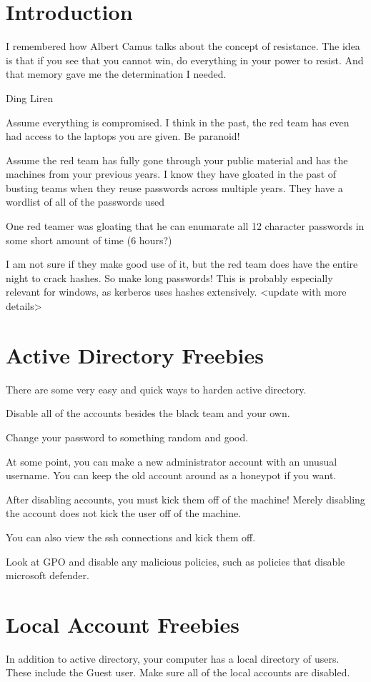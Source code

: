 \documentclass{article}
\begin{document}
\graphicspath{ {./Images/} }
\tableofcontents

\section{Introduction}
\epigraph{I remembered how Albert Camus talks about the concept of resistance. 
The idea is that if you see that you cannot win, do everything in your power to resist. And that memory gave me the determination I needed.}
{Ding Liren}

Assume everything is compromised. I think in the past, the red team has even had access to the laptops you are given. Be paranoid!

Assume the red team has fully gone through your public material and has the machines from your previous years.
I know they have gloated in the past of busting teams when they reuse passwords across multiple years.
They have a wordlist of all of the passwords used 

One red teamer was gloating that he can enumarate all 12 character passwords in some short amount of time (6 hours?)

I am not sure if they make good use of it, but the red team does have the entire night to crack hashes. So make long passwords!
This is probably especially relevant for windows, as kerberos uses hashes extensively. <update with more details>

\section{Active Directory Freebies}
There are some very easy and quick ways to harden active directory. 

Disable all of the accounts besides the black team and your own.

Change your password to something random and good. 

At some point, you can make a new administrator account with an unusual username. You can keep the old account around as a honeypot if you want.

After disabling accounts, you must kick them off of the machine! Merely disabling the account does not kick the user off of the machine.

You can also view the ssh connections and kick them off.

Look at GPO and disable any malicious policies, such as policies that disable microsoft defender.

\section{Local Account Freebies}
In addition to active directory, your computer has a local directory of users. These include the Guest user.
Make sure all of the local accounts are disabled.
\end{document}
